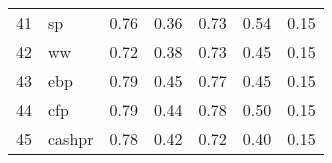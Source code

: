 \documentclass[12pt]{article}
\begin{document}
\begin{footnotesize}
\begin{longtable}{rl|c|c|c|c|c}
				41                   & sp                          & 0.76                             & 0.36                                                                                          & 0.73                                                                                          & 0.54                                                                                          & 0.15                                                                                                   \\
				42                   & ww                          & 0.72                             & 0.38                                                                                          & 0.73                                                                                          & 0.45                                                                                          & 0.15                                                                                                   \\
				43                   & ebp                         & 0.79                             & 0.45                                                                                          & 0.77                                                                                          & 0.45                                                                                          & 0.15                                                                                                   \\
				44                   & cfp                         & 0.79                             & 0.44                                                                                          & 0.78                                                                                          & 0.50                                                                                          & 0.15                                                                                                   \\
				45                   & cashpr                      & 0.78                             & 0.42                                                                                          & 0.72                                                                                          & 0.40                                                                                          & 0.15                                                                                                   \\

\end{longtable}
\end{footnotesize}
\end{document}

